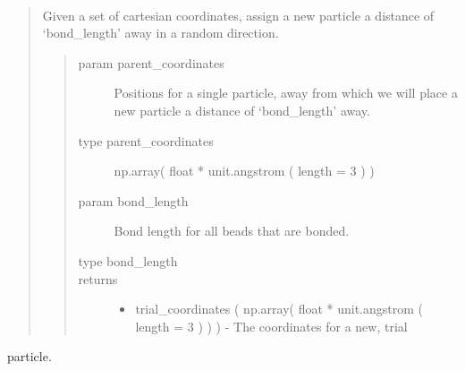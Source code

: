 \documentclass[letterpaper,12pt,english,openany,oneside]{sphinxmanual}
\begin{document}

\begin{fulllineitems}
\label{\detokenize{utilities:utilities.util.attempt_move}}~\begin{quote}

Given a set of cartesian coordinates, assign a new particle
a distance of ‘bond\_length’ away in a random direction.
\begin{quote}\begin{description}
\item[{param parent\_coordinates}] \leavevmode
Positions for a single particle, away from which we will place a new particle a distance of ‘bond\_length’ away.

\item[{type parent\_coordinates}] \leavevmode
np.array( float * unit.angstrom ( length = 3 ) )

\item[{param bond\_length}] \leavevmode
Bond length for all beads that are bonded.

\item[{type bond\_length}] \leavevmode
{}

\item[{returns}] \leavevmode\begin{itemize}
\item {} 
trial\_coordinates ( np.array( float * unit.angstrom ( length = 3 ) ) ) - The coordinates for a new, trial

\end{itemize}

\end{description}\end{quote}
\end{quote}

particle.

\end{fulllineitems}

\end{document}
